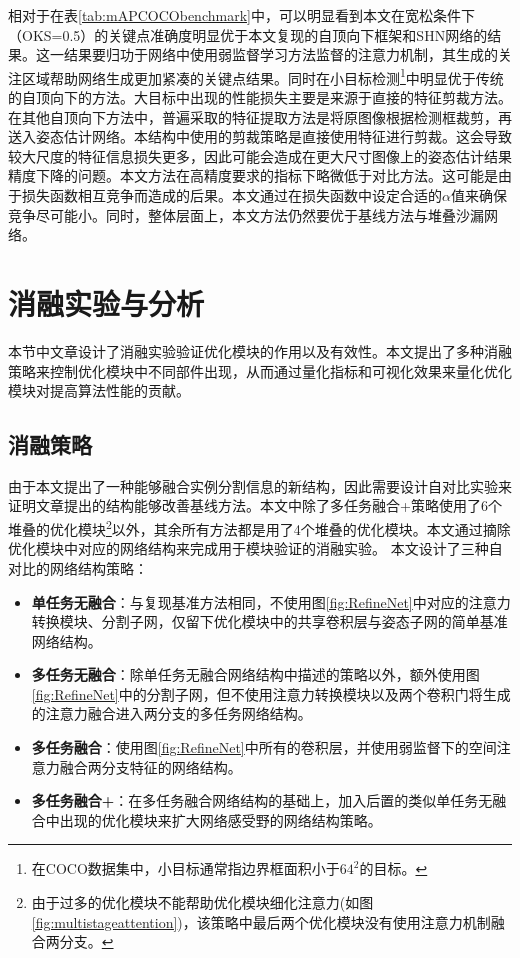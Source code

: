 相对于在表\ref{tab:mAPCOCObenchmark}中，可以明显看到本文在宽松条件下（OKS=0.5）的关键点准确度明显优于本文复现的自顶向下框架和SHN网络的结果。这一结果要归功于网络中使用弱监督学习方法监督的注意力机制，其生成的关注区域帮助网络生成更加紧凑的关键点结果。同时在小目标检测\footnote{在COCO数据集中，小目标通常指边界框面积小于$64^2$的目标。}中明显优于传统的自顶向下的方法。大目标中出现的性能损失主要是来源于直接的特征剪裁方法。在其他自顶向下方法中，普遍采取的特征提取方法是将原图像根据检测框裁剪，再送入姿态估计网络。本结构中使用的剪裁策略是直接使用特征进行剪裁。这会导致较大尺度的特征信息损失更多，因此可能会造成在更大尺寸图像上的姿态估计结果精度下降的问题。本文方法在高精度要求的指标下略微低于对比方法。这可能是由于损失函数相互竞争而造成的后果。本文通过在损失函数中设定合适的$\alpha$值来确保竞争尽可能小。同时，整体层面上，本文方法仍然要优于基线方法与堆叠沙漏网络。

\section{消融实验与分析}
\label{sec:ablation}
本节中文章设计了消融实验验证优化模块的作用以及有效性。本文提出了多种消融策略来控制优化模块中不同部件出现，从而通过量化指标和可视化效果来量化优化模块对提高算法性能的贡献。
\subsection{消融策略}
\label{subsec:selfstrategy}
由于本文提出了一种能够融合实例分割信息的新结构，因此需要设计自对比实验来证明文章提出的结构能够改善基线方法。本文中除了多任务融合+策略使用了6个堆叠的优化模块\footnote{由于过多的优化模块不能帮助优化模块细化注意力(如图\ref{fig:multistageattention})，该策略中最后两个优化模块没有使用注意力机制融合两分支。}以外，其余所有方法都是用了4个堆叠的优化模块。本文通过摘除优化模块中对应的网络结构来完成用于模块验证的消融实验。
本文设计了三种自对比的网络结构策略：
\begin{itemize}
	\item \textbf{单任务无融合}：与复现基准方法相同，不使用图\ref{fig:RefineNet}中对应的注意力转换模块、分割子网，仅留下优化模块中的共享卷积层与姿态子网的简单基准网络结构。
	\item \textbf{多任务无融合}：除单任务无融合网络结构中描述的策略以外，额外使用图\ref{fig:RefineNet}中的分割子网，但不使用注意力转换模块以及两个卷积门将生成的注意力融合进入两分支的多任务网络结构。
	\item \textbf{多任务融合}：使用图\ref{fig:RefineNet}中所有的卷积层，并使用弱监督下的空间注意力融合两分支特征的网络结构。
	\item \textbf{多任务融合+}：在多任务融合网络结构的基础上，加入后置的类似单任务无融合中出现的优化模块来扩大网络感受野的网络结构策略。
\end{itemize}


